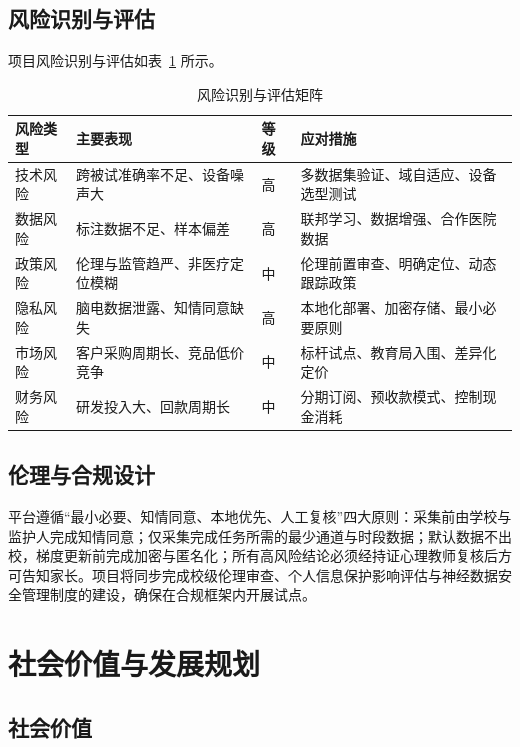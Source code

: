 \documentclass[zihao=-4,fontset=windows,a4paper]{ctexart}
\begin{document}
\subsection{风险识别与评估}

项目风险识别与评估如表~\ref{tab:risk} 所示。

\begin{table}[H]
\centering
\caption{风险识别与评估矩阵}
\label{tab:risk}
\begin{tabular}{p{2.6cm}p{3.6cm}p{1.8cm}p{5.4cm}}
\toprule
\textbf{风险类型} & \textbf{主要表现} & \textbf{等级} & \textbf{应对措施} \\
\midrule
技术风险 & 跨被试准确率不足、设备噪声大 & 高 & 多数据集验证、域自适应、设备选型测试 \\
数据风险 & 标注数据不足、样本偏差 & 高 & 联邦学习、数据增强、合作医院数据 \\
政策风险 & 伦理与监管趋严、非医疗定位模糊 & 中 & 伦理前置审查、明确定位、动态跟踪政策 \\
隐私风险 & 脑电数据泄露、知情同意缺失 & 高 & 本地化部署、加密存储、最小必要原则 \\
市场风险 & 客户采购周期长、竞品低价竞争 & 中 & 标杆试点、教育局入围、差异化定价 \\
财务风险 & 研发投入大、回款周期长 & 中 & 分期订阅、预收款模式、控制现金消耗 \\
\bottomrule
\end{tabular}
\end{table}

\subsection{伦理与合规设计}

平台遵循“最小必要、知情同意、本地优先、人工复核”四大原则：采集前由学校与监护人完成知情同意；仅采集完成任务所需的最少通道与时段数据；默认数据不出校，梯度更新前完成加密与匿名化；所有高风险结论必须经持证心理教师复核后方可告知家长。项目将同步完成校级伦理审查、个人信息保护影响评估与神经数据安全管理制度的建设，确保在合规框架内开展试点。

\section{社会价值与发展规划}

\subsection{社会价值}
\end{document}
